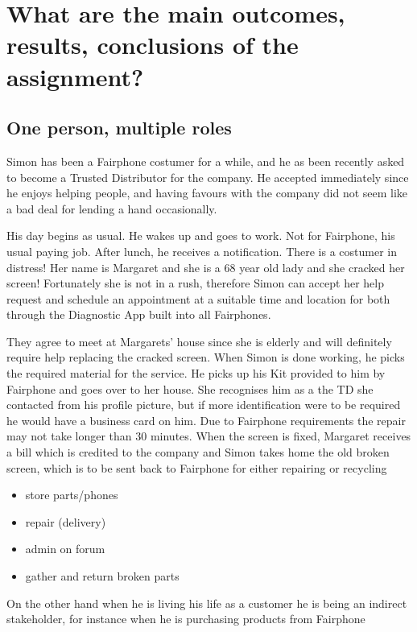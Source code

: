 \section{What are the main outcomes, results, conclusions of the assignment?}
\subsection{One person, multiple roles}
Simon has been a Fairphone costumer for a while, and he as been recently asked to become a Trusted Distributor for the company. He accepted immediately since he enjoys helping people, and having favours with the company did not seem like a bad deal for lending a hand occasionally. 

His day begins as usual. He wakes up and goes to work. Not for Fairphone, his usual paying job. After lunch, he receives a notification. There is a costumer in distress! Her name is Margaret and she is a 68 year old lady and she cracked her screen! Fortunately she is not in a rush, therefore Simon can accept her help request and schedule an appointment at a suitable time and location for both through the Diagnostic App built into all Fairphones. 

They agree to meet at Margarets' house since she is elderly and will definitely require help replacing the cracked screen. When Simon is done working, he picks the required material for the service. He picks up his Kit provided to him by Fairphone and goes over to her house. She recognises him as a the TD she contacted from his profile picture, but if more identification were to be required he would have a business card on him. Due to Fairphone requirements the repair may not take longer than 30 minutes. When the screen is fixed, Margaret receives a bill which is credited to the company and Simon takes home the old broken screen, which is to be sent back to Fairphone for either repairing or recycling 

\begin{itemize}
	\item store parts/phones
	\item repair (delivery)
	\item admin on forum
	\item gather and return broken parts
	
\end{itemize}
On the other hand when he is living his life as a customer he is being an indirect stakeholder, for instance when he is purchasing products from Fairphone 
